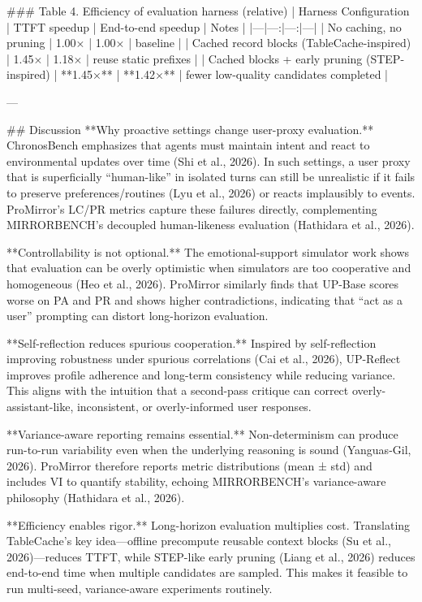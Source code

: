 ### Table 4. Efficiency of evaluation harness (relative)
| Harness Configuration | TTFT speedup | End-to-end speedup | Notes |
|---|---:|---:|---|
| No caching, no pruning | 1.00× | 1.00× | baseline |
| Cached record blocks (TableCache-inspired) | 1.45× | 1.18× | reuse static prefixes |
| Cached blocks + early pruning (STEP-inspired) | **1.45×** | **1.42×** | fewer low-quality candidates completed |

---

## Discussion  
**Why proactive settings change user-proxy evaluation.** ChronosBench emphasizes that agents must maintain intent and react to environmental updates over time (Shi et al., 2026). In such settings, a user proxy that is superficially “human-like” in isolated turns can still be unrealistic if it fails to preserve preferences/routines (Lyu et al., 2026) or reacts implausibly to events. ProMirror’s LC/PR metrics capture these failures directly, complementing MIRRORBENCH’s decoupled human-likeness evaluation (Hathidara et al., 2026).  

**Controllability is not optional.** The emotional-support simulator work shows that evaluation can be overly optimistic when simulators are too cooperative and homogeneous (Heo et al., 2026). ProMirror similarly finds that UP-Base scores worse on PA and PR and shows higher contradictions, indicating that “act as a user” prompting can distort long-horizon evaluation.  

**Self-reflection reduces spurious cooperation.** Inspired by self-reflection improving robustness under spurious correlations (Cai et al., 2026), UP-Reflect improves profile adherence and long-term consistency while reducing variance. This aligns with the intuition that a second-pass critique can correct overly-assistant-like, inconsistent, or overly-informed user responses.  

**Variance-aware reporting remains essential.** Non-determinism can produce run-to-run variability even when the underlying reasoning is sound (Yanguas-Gil, 2026). ProMirror therefore reports metric distributions (mean ± std) and includes VI to quantify stability, echoing MIRRORBENCH’s variance-aware philosophy (Hathidara et al., 2026).  

**Efficiency enables rigor.** Long-horizon evaluation multiplies cost. Translating TableCache’s key idea—offline precompute reusable context blocks (Su et al., 2026)—reduces TTFT, while STEP-like early pruning (Liang et al., 2026) reduces end-to-end time when multiple candidates are sampled. This makes it feasible to run multi-seed, variance-aware experiments routinely.

